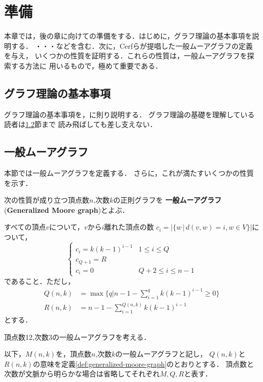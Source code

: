 
\chapter{準備}
\label{chap:preliminary}
本章では，後の章に向けての準備をする．はじめに，グラフ理論の基本事項を説明する．
・・・などを含む．次に，Cerfらが提唱した一般ムーアグラフの定義を与え，
いくつかの性質を証明する．これらの性質は，一般ムーアグラフを探索する方法に
用いるもので，極めて重要である．

\section{グラフ理論の基本事項}
\label{sect:basic-graph-theory}
グラフ理論の基本事項を，\cite{Diestel2000}に則り説明する．
グラフ理論の基礎を理解している読者は\ref{sect:generalized-moore-graph}節まで
読み飛ばしても差し支えない．

\section{一般ムーアグラフ}
\label{sect:generalized-moore-graph}
本節では一般ムーアグラフを定義する．
さらに，これが満たすいくつかの性質を示す．

\begin{definition}
  \label{def:generalized-moore-graph}
  次の性質が成り立つ頂点数$n$,次数$k$の正則グラフを
  \textbf{一般ムーアグラフ}(\textbf{Generalized Moore graph})とよぶ．

  すべての頂点$v$について，$v$から$i$離れた頂点の数
  $c_i = \lvert\{ w\,|\,d(v,w) = i , w\in V \}\rvert$について，
  \[ \begin{cases}
    c_i = k(k-1)^{i-1} & 1\leq i\leq Q \\
    c_{Q+1} = R & \\
    c_i = 0 & Q+2\leq i \leq n-1
  \end{cases} \]
  であること．ただし，
  \begin{align*}
    Q(n,k) &= \max\{q | n-1-\sum_{i=1}^{q}k(k-1)^{i-1} \geq 0\} \\
    R(n,k) &= n - 1 - \sum_{i=1}^{Q(n,k)}k(k-1)^{i-1}
  \end{align*}
  とする．
\end{definition}
\begin{example}
  頂点数12,次数3の一般ムーアグラフを考える．
\end{example}
以下，$M(n,k)$を，頂点数$n$,次数$k$の一般ムーアグラフと記し，
$Q(n,k)$と$R(n,k)$の意味を定義\ref{def:generalized-moore-graph}のとおりとする．
頂点数と次数が文脈から明らかな場合は省略してそれぞれ$M,Q,R$と表す．

